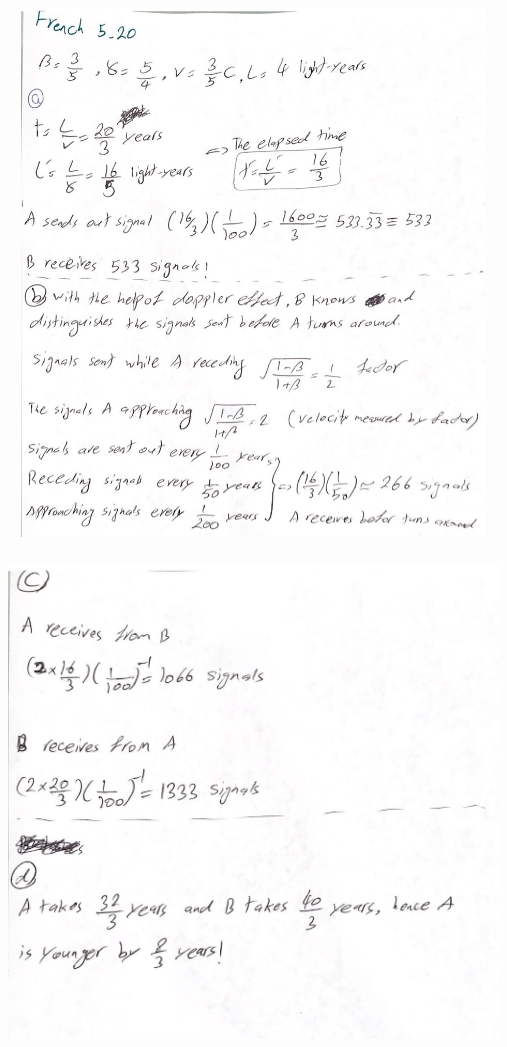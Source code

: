 \documentclass[fleqn]{article}
\begin{document}
\begin{enumerate}
    \begin{center}
      \includegraphics[height=14cm, width=13cm]{3.JPG}
    \end{center}

    \begin{center}
      \includegraphics[height=13cm, width=13cm]{4.JPG}
    \end{center}
    


\end{enumerate}
\end{document}
